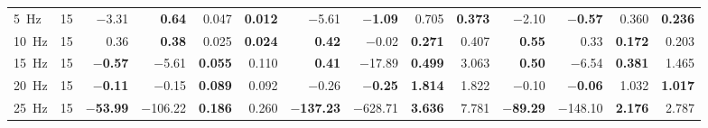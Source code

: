 \begin{tabular}{l r rrrr rrrr rrrr}
\SI{5}{\hertz} & 15 & $-$3.31 & \textbf{0.64} & 0.047 & \textbf{0.012} & $-$5.61 & \textbf{$-$1.09} & 0.705 & \textbf{0.373} & $-$2.10 & \textbf{$-$0.57} & 0.360 & \textbf{0.236} \\
\SI{10}{\hertz} & 15 & 0.36 & \textbf{0.38} & 0.025 & \textbf{0.024} & \textbf{0.42} & $-$0.02 & \textbf{0.271} & 0.407 & \textbf{0.55} & 0.33 & \textbf{0.172} & 0.203 \\
\SI{15}{\hertz} & 15 & \textbf{$-$0.57} & $-$5.61 & \textbf{0.055} & 0.110 & \textbf{0.41} & $-$17.89 & \textbf{0.499} & 3.063 & \textbf{0.50} & $-$6.54 & \textbf{0.381} & 1.465 \\
\SI{20}{\hertz} & 15 & \textbf{$-$0.11} & $-$0.15 & \textbf{0.089} & 0.092 & $-$0.26 & \textbf{$-$0.25} & \textbf{1.814} & 1.822 & $-$0.10 & \textbf{$-$0.06} & 1.032 & \textbf{1.017} \\
\SI{25}{\hertz} & 15 & \textbf{$-$53.99} & $-$106.22 & \textbf{0.186} & 0.260 & \textbf{$-$137.23} & $-$628.71 & \textbf{3.636} & 7.781 & \textbf{$-$89.29} & $-$148.10 & \textbf{2.176} & 2.787 \\
\bottomrule
\end{tabular}
